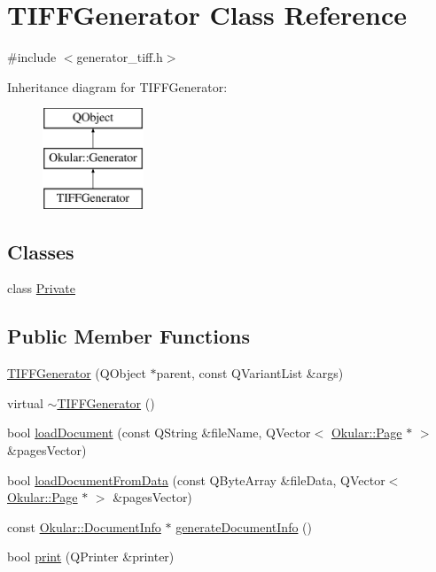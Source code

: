 \hypertarget{classTIFFGenerator}{\section{T\+I\+F\+F\+Generator Class Reference}
\label{classTIFFGenerator}
}


{\ttfamily \#include $<$generator\+\_\+tiff.\+h$>$}

Inheritance diagram for T\+I\+F\+F\+Generator\+:\begin{figure}[H]
\begin{center}
\leavevmode
\includegraphics[height=3.000000cm]{classTIFFGenerator}
\end{center}
\end{figure}
\subsection*{Classes}
\begin{DoxyCompactItemize}
\item 
class \hyperlink{classTIFFGenerator_1_1Private}{Private}
\end{DoxyCompactItemize}
\subsection*{Public Member Functions}
\begin{DoxyCompactItemize}
\item 
\hyperlink{classTIFFGenerator_a8a4fcd61f40954d1c17fd3b880fe230c}{T\+I\+F\+F\+Generator} (Q\+Object $\ast$parent, const Q\+Variant\+List \&args)
\item 
virtual \hyperlink{classTIFFGenerator_ae8a40ff2851a47625811c041a30d61af}{$\sim$\+T\+I\+F\+F\+Generator} ()
\item 
bool \hyperlink{classTIFFGenerator_aebdfa77295efd1f9310b750e284dac5b}{load\+Document} (const Q\+String \&file\+Name, Q\+Vector$<$ \hyperlink{classOkular_1_1Page}{Okular\+::\+Page} $\ast$ $>$ \&pages\+Vector)
\item 
bool \hyperlink{classTIFFGenerator_ab72ff71c466bd6f0e76ec6ffcc228106}{load\+Document\+From\+Data} (const Q\+Byte\+Array \&file\+Data, Q\+Vector$<$ \hyperlink{classOkular_1_1Page}{Okular\+::\+Page} $\ast$ $>$ \&pages\+Vector)
\item 
const \hyperlink{classOkular_1_1DocumentInfo}{Okular\+::\+Document\+Info} $\ast$ \hyperlink{classTIFFGenerator_ae24ee9b78bb2dcc95ca8a74e2abea900}{generate\+Document\+Info} ()
\item 
bool \hyperlink{classTIFFGenerator_a17cf8bd0f2821fc8d85473f03ba93686}{print} (Q\+Printer \&printer)
\end{DoxyCompactItemize}
